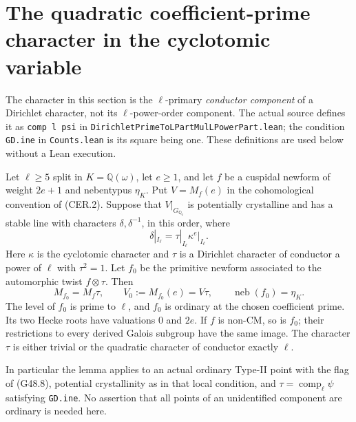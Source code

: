 \section{The quadratic coefficient-prime character in the cyclotomic variable}
\label{sec:cubic-ramified-cyclotomic}

The character in this section is the $\ell$-primary
\emph{conductor component} of a Dirichlet character, not its
$\ell$-power-order component.  The actual source defines it
as \texttt{comp l psi} in
\texttt{DirichletPrimeToLPartMulLPowerPart.lean}; the condition
\texttt{GD.ine} in \texttt{Counts.lean} is its square being one.
These definitions are used below without a Lean execution.

\begin{lemma}
\label{AC-K29-good-twist}
Let $\ell\ge5$ split in $K=\mathbb Q(\omega)$, let $e\ge1$,
and let $f$ be a cuspidal newform of weight $2e+1$ and
nebentypus $\eta_K$.  Put $V=M_f(e)$ in the cohomological
convention of (CER.2).  Suppose that $V|_{G_{\mathbb Q_\ell}}$
is potentially crystalline and has a stable line with
characters $\delta,\delta^{-1}$, in this order, where
\[
       \delta|_{I_\ell}=\tau|_{I_\ell}\kappa^e|_{I_\ell}.
                                                        \tag{CRC.1}
\]
Here $\kappa$ is the cyclotomic character and $\tau$ is a
Dirichlet character of conductor a power of $\ell$ with
$\tau^2=1$.  Let $f_0$ be the primitive newform associated
to the automorphic twist $f\otimes\tau$.  Then
\[
 M_{f_0}=M_f\tau,\qquad V_0:=M_{f_0}(e)=V\tau,
 \qquad \operatorname{neb}(f_0)=\eta_K.                    \tag{CRC.2}
\]
The level of $f_0$ is prime to $\ell$, and $f_0$ is
ordinary at the chosen coefficient prime.  Its two Hecke
roots have valuations $0$ and $2e$.
If $f$ is non-CM, so is $f_0$; their restrictions to every
derived Galois subgroup have the same image.
The character $\tau$ is either trivial or the quadratic
character of conductor exactly $\ell$.

In particular the lemma applies to an actual ordinary
Type-II point with the flag of (G48.8), potential
crystallinity as in that local condition, and
$\tau=\operatorname{comp}_\ell\psi$ satisfying
\texttt{GD.ine}.  No assertion that all points of an
unidentified component are ordinary is needed here.
\end{lemma}
